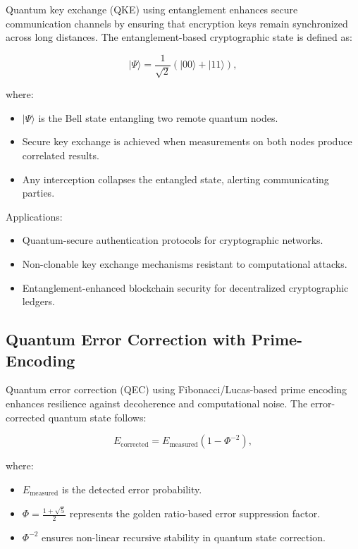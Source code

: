 \documentclass{article}
\theoremstyle{plain}
\begin{document}
Quantum key exchange (QKE) using entanglement enhances secure communication channels by ensuring that encryption keys remain synchronized across long distances. The entanglement-based cryptographic state is defined as:

\begin{equation}
|\Psi\rangle = \frac{1}{\sqrt{2}} (|00\rangle + |11\rangle),
\end{equation}

where:
\begin{itemize}
    \item $|\Psi\rangle$ is the Bell state entangling two remote quantum nodes.
    \item Secure key exchange is achieved when measurements on both nodes produce correlated results.
    \item Any interception collapses the entangled state, alerting communicating parties.
\end{itemize}

Applications:
\begin{itemize}
    \item Quantum-secure authentication protocols for cryptographic networks.
    \item Non-clonable key exchange mechanisms resistant to computational attacks.
    \item Entanglement-enhanced blockchain security for decentralized cryptographic ledgers.
\end{itemize}

\subsection{Quantum Error Correction with Prime-Encoding}

Quantum error correction (QEC) using Fibonacci/Lucas-based prime encoding enhances resilience against decoherence and computational noise. The error-corrected quantum state follows:

\begin{equation}
E_{\text{corrected}} = E_{\text{measured}}(1 - \Phi^{-2}),
\end{equation}

where:
\begin{itemize}
    \item $E_{\text{measured}}$ is the detected error probability.
    \item $\Phi = \frac{1+\sqrt{5}}{2}$ represents the golden ratio-based error suppression factor.
    \item $\Phi^{-2}$ ensures non-linear recursive stability in quantum state correction.
\end{itemize}
\end{document}
